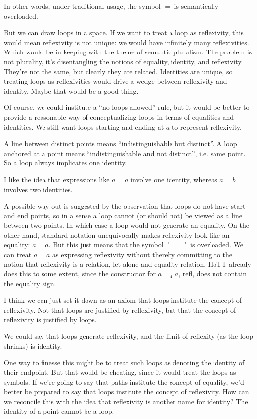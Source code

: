 \documentclass{article}
\begin{document}
In other words, under traditional usage, the symbol \(=\) is
semantically overloaded.

But we can draw loops in a space. If we want to treat a loop as
reflexivity, this would mean reflexivity is not unique: we would have
infinitely many reflexivities. Which would be in keeping with the
theme of semantic pluralism. The problem is not plurality, it's
disentangling the notions of equality, identity, and reflexivity.
They're not the same, but clearly they are related. Identities are
unique, so treating loops as reflexivities would drive a wedge between
reflexivity and identity. Maybe that would be a good thing.

Of course, we could institute a ``no loops allowed'' rule, but it
would be better to provide a reasonable way of conceptualizing loops
in terms of equalities and identities. We still want loops starting
and ending at \(a\) to represent reflexivity.

A line between distinct points means ``indistinguishable but
distinct''. A loop anchored at a point means ``indistinguishable and
not distinct'', i.e. same point. So a loop always implicates one
identity.

I like the idea that expressions like \(a=a\) involve one identity,
whereas \(a=b\) involves two identities.

A possible way out is suggested by the observation that loops do not
have start and end points, so in a sense a loop cannot (or should not)
be viewed as a line between two points. In which case a loop would not
generate an equality. On the other hand, standard notation
unequivocally makes reflexivity look like an equality: \(a=a\). But
this just means that the symbol \(\ulcorner = \urcorner\) is
overloaded. We can treat \(a=a\) as expressing reflexivity without
thereby committing to the notion that reflexivity is a relation, let
alone and equality relation. HoTT already does this to some extent,
since the constructor for \(a=_A a\), \textsf{refl}, does not contain
the equality sign.

I think we can just set it down as an axiom that loops institute the
concept of reflexivity. Not that loops are justified by reflexivity,
but that the concept of reflexivity is justified by loops.

We could say that loops generate reflexivity, and the limit of
reflexity (as the loop shrinks) is identity.

One way to finesse this might be to treat such loops as denoting the
identity of their endpoint. But that would be cheating, since it would
treat the loops as symbols. If we're going to say that paths institute
the concept of equality, we'd better be prepared to say that loops
institute the concept of reflexivity. How can we reconcile this with
the idea that reflexivity is another name for identity? The identity
of a point cannot be a loop.
\end{document}
